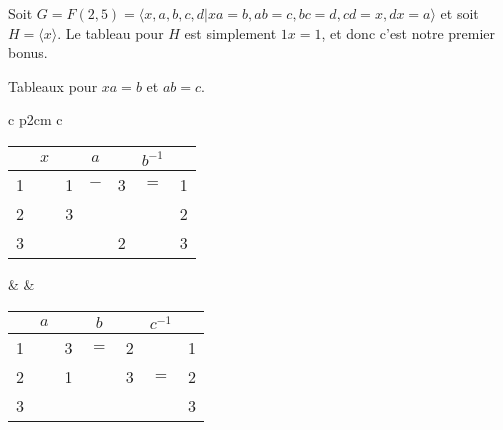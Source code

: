      \begin{ex}
       Soit $G = F(2,5) = \langle x, a, b, c, d | xa = b, ab = c, bc = d, cd = x, dx = a \rangle$ et soit $H =
       \langle x \rangle$. Le tableau pour $H$ est simplement $1x = 1$, et donc c'est notre premier bonus.
       
       Tableaux pour $xa = b$ et $ab = c$.
       \begin{center}
         \begin{tabular}{c p{2cm} c}
           \begin{tabular}{|ccccccc|}
             \hline
               & $x$ &   & $a$ &   & $b^{-1}$ & \\
             \hline
             1 &     & 1 & $-$ & 3 & $=$     & 1\\
             2 &     & 3 &     &   &         & 2\\
             3 &     &   &     & 2 &         & 3\\
             \hline
           \end{tabular}
               & &
                   \begin{tabular}{|ccccccc|}
                     \hline
                       & $a$ &   & $b$ &   & $c^{-1}$ & \\
                     \hline
                     1 &     & 3 & $=$ & 2 &         & 1\\
                     2 &     & 1 &     & 3 & $=$     & 2\\
                     3 &     &   &     &   &         & 3\\
                     \hline
                   \end{tabular}
         \end{tabular}
       \end{center}


\end{ex}
